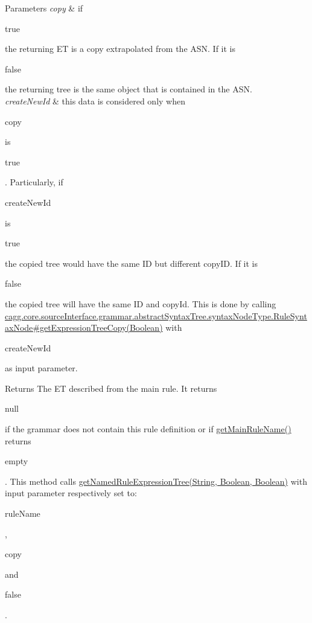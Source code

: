 \begin{DoxyParams}{Parameters}
{\em copy} & if
\begin{DoxyCode}
\textcolor{keyword}{true} 
\end{DoxyCode}
 the returning E\-T is a copy extrapolated from the A\-S\-N. If it is 
\begin{DoxyCode}
\textcolor{keyword}{false} 
\end{DoxyCode}
 the returning tree is the same object that is contained in the A\-S\-N. \\
\hline
{\em create\-New\-Id} & this data is considered only when
\begin{DoxyCode}
copy 
\end{DoxyCode}
 is
\begin{DoxyCode}
\textcolor{keyword}{true} 
\end{DoxyCode}
 . Particularly, if
\begin{DoxyCode}
createNewId 
\end{DoxyCode}
 is
\begin{DoxyCode}
\textcolor{keyword}{true} 
\end{DoxyCode}
 the copied tree would have the same I\-D but different copy\-I\-D. If it is
\begin{DoxyCode}
\textcolor{keyword}{false} 
\end{DoxyCode}
 the copied tree will have the same I\-D and copy\-Id. This is done by calling \hyperlink{}{cagg.\-core.\-source\-Interface.\-grammar.\-abstract\-Syntax\-Tree.\-syntax\-Node\-Type.\-Rule\-Syntax\-Node\#get\-Expression\-Tree\-Copy(\-Boolean)} with
\begin{DoxyCode}
createNewId 
\end{DoxyCode}
 as input parameter. \\
\hline
\end{DoxyParams}
\begin{DoxyReturn}{Returns}
The E\-T described from the main rule. It returns
\begin{DoxyCode}
null 
\end{DoxyCode}
 if the grammar does not contain this rule definition or if \hyperlink{classit_1_1emarolab_1_1cagg_1_1core_1_1language_1_1syntax_1_1GrammarPrimitive_a82656685c1fced207c2cb8a20bf977a7}{get\-Main\-Rule\-Name()} returns
\begin{DoxyCode}
empty 
\end{DoxyCode}
 . This method calls \hyperlink{}{get\-Named\-Rule\-Expression\-Tree(\-String, Boolean, Boolean)} with input parameter respectively set to\-:
\begin{DoxyCode}
ruleName 
\end{DoxyCode}
 ,
\begin{DoxyCode}
copy 
\end{DoxyCode}
 and
\begin{DoxyCode}
\textcolor{keyword}{false} 
\end{DoxyCode}
 . 
\end{DoxyReturn}

